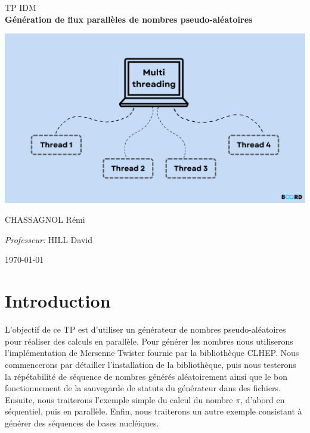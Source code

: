 \documentclass[a4paper]{article}
\begin{document}
\begin{titlepage}
\begin{center}

    \textsc{\LARGE TP IDM}\\[0.5cm]

    {\huge \bfseries Génération de flux parallèles de nombres pseudo-aléatoires\\[3cm]}

      \centering
      \includegraphics[scale=0.3]{./img/banner.png}

      \vspace*{\fill}

    \begin{multicols}{2}
      \large
      CHASSAGNOL Rémi\\

      \columnbreak

      \large
      \emph{Professeur:} HILL David\\
    \end{multicols}

    \textsc{\today}

  \end{center}
\end{titlepage}

\clearpage
\tableofcontents
\listoflistings
\clearpage

\section{Introduction}

L'objectif de ce TP est d'utiliser un générateur de nombres pseudo-aléatoires
pour réaliser des calculs en parallèle. Pour générer les nombres nous
utiliserons l'implémentation de Mersenne Twister fournie par la bibliothèque
CLHEP. Nous commencerons par détailler l'installation de la bibliothèque, puis
nous testerons la répétabilité de séquence de nombres générés aléatoirement
ainsi que le bon fonctionnement de la sauvegarde de statuts du générateur dans
des fichiers. Ensuite, nous traiterons l'exemple simple du calcul du nombre
$\pi$, d'abord en séquentiel, puis en parallèle. Enfin, nous traiterons un autre
exemple consistant à générer des séquences de bases nucléiques.\\
\end{document}
